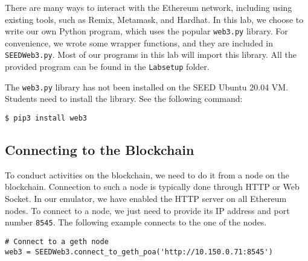 There are many ways to interact with the Ethereum network,
including using existing tools, such as Remix, Metamask, and Hardhat.
In this lab, we choose to write our own Python program, 
which uses the popular \texttt{web3.py} library. 
For convenience, we wrote some wrapper functions, and 
they are included in \texttt{SEEDWeb3.py}.  Most of our
programs in this lab will import this library. 
All the provided program can be found in the
\texttt{Labsetup} folder.  


The \texttt{web3.py} library has not been installed on the SEED Ubuntu 20.04 VM. 
Students need to install the library. See the following command:

\begin{lstlisting}
$ pip3 install web3
\end{lstlisting}





\subsection{Connecting to the Blockchain} 
\label{sec:sub:ports}



To conduct activities on the blockchain, we need to 
do it from a node on the blockchain. Connection to
such a node is typically done through HTTP or Web Socket. 
In our emulator, we have enabled the HTTP server on
all Ethereum nodes. 
To connect to a node, we just need to provide its IP address 
and port number \texttt{8545}. 
The following example connects to the one of the nodes.

\begin{lstlisting}
# Connect to a geth node
web3 = SEEDWeb3.connect_to_geth_poa('http://10.150.0.71:8545')
\end{lstlisting}



